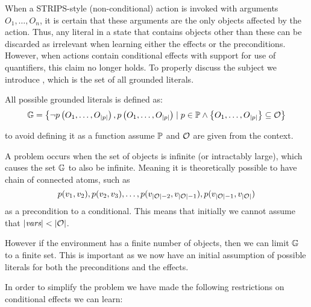 \documentclass[\master/Master.tex]{subfiles}
\begin{document}
When a STRIPS-style (non-conditional) action is invoked with arguments $O_1, \dots, O_n$, it is certain that these arguments are the only objects affected by the action.
Thus, any literal in a state that contains objects other than these can be discarded as irrelevant when learning either the effects or the preconditions.
However, when actions contain conditional effects with support for use of quantifiers, this claim no longer holds.
To properly discuss the subject we introduce \glits, which is the set of all grounded literals.

\begin{definition}
	All possible grounded literals \glits is defined as:
	\begin{equation*}
		\mathbb{G} =
		\left\{ \neg p\left(O_1, \dots, O_{|p|}\right), 
				p\left(O_1, \dots, O_{|p|}\right) 
				\mid 
		p \in \mathbb{P} \land 
		\left\{O_1, \dots, O_{|p|} \right\} \subseteq \mathcal{O}
		\right\}
	\end{equation*}
	
	to avoid defining it as a function assume $\mathbb{P}$ and $\mathcal{O}$ are given from the context.
\end{definition}

A problem occurs when the set of objects \objs is infinite (or intractably large), which causes the set $\mathbb{G}$ to also be infinite.
Meaning it is theoretically possible to have chain of connected atoms, such as 
\begin{equation*}
	p(v_1,v_2), p(v_2,v_3),\dots, p(v_{|\mathcal{O}|-2},v_{|\mathcal{O}|-1}), p(v_{|\mathcal{O}|-1},v_{|\mathcal{O}|})
\end{equation*}
 as a precondition to a conditional.
This means that initially we cannot assume that $|\textit{vars}| < |\mathcal{O}|$.

However if the environment has a finite number of objects, then we can limit $\mathbb{G}$ to a finite set.
This is important as we now have an initial assumption of possible literals for both the preconditions and the effects.

In order to simplify the problem we have made the following restrictions on conditional effects we can learn:

\end{document}
